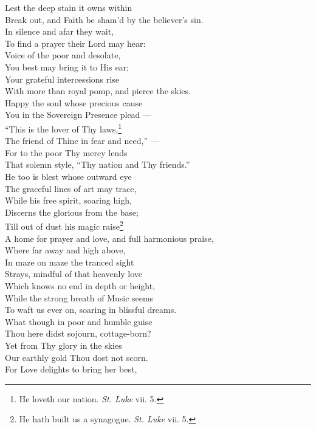  Lest the deep stain it owns within \\
 Break out, and Faith be sham’d by the believer’s sin. \\
  In silence and afar they wait, \\
 To find a prayer their Lord may hear: \\
 Voice of the poor and desolate, \\
 You best may bring it to His ear; \\
 Your grateful intercessions rise \\
 With more than royal pomp, and pierce the skies. \\
  Happy the soul whose precious cause \\
 You in the Sovereign Presence plead — \\
 “This is the lover of Thy laws,\footnote{He loveth our nation. \emph{St. Luke} vii. 5.} \\
 The friend of Thine in fear and need,” —\\
 For to the poor Thy mercy lends \\
 That solemn style, “Thy nation and Thy friends.” \\
  He too is blest whose outward eye \\
 The graceful lines of art may trace, \\
 While his free spirit, soaring high, \\
 Discerns the glorious from the base; \\
 Till out of dust his magic raise\footnote{He hath built us a synagogue. \emph{St. Luke} vii. 5.} \\
 A home for prayer and love, and full harmonious praise, \\
  Where far away and high above, \\
 In maze on maze the tranced sight \\
 Strays, mindful of that heavenly love \\
 Which knows no end in depth or height, \\
 While the strong breath of Music seems \\
 To waft us ever on, soaring in blissful dreams. \\
  What though in poor and humble guise \\
 Thou here didst sojourn, cottage-born? \\
 Yet from Thy glory in the skies \\
 Our earthly gold Thou dost not scorn. \\
 For Love delights to bring her best, \\
